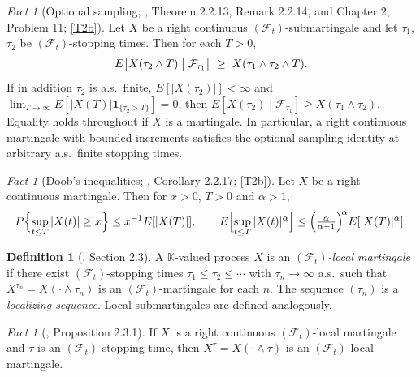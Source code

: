 \documentclass[11pt,a4paper]{article}
\theoremstyle{plain}
\theoremstyle{definition}
\newtheorem{definition}[theorem]{Definition}
\theoremstyle{remark}
\newtheorem{fact}[theorem]{Fact}
\newcommand{\Filt}{\mathcal{F}}
\newcommand{\K}{\mathbb{K}}
\newcommand{\one}{\mathbf{1}}
\newcommand{\EK}{\cite{EK86}}
\begin{document}
\begin{fact}[Optional sampling; \EK, Theorem 2.2.13, Remark 2.2.14, and Chapter 2, Problem 11; \eqref{T2b}]
  \label{fact:optsampl}
  Let $X$ be a right continuous $(\Filt_t)$-submartingale and let $\tau_1$,
  $\tau_2$ be $(\Filt_t)$-stopping times.  Then for each $T > 0$,
  \begin{equation}
    \label{eq:optsampl}
    E\bigl[ X(\tau_2 \wedge T) \bigm| \Filt_{\tau_1} \bigr]
      \;\geq\; X(\tau_1 \wedge \tau_2 \wedge T) .
  \end{equation}
  If in addition $\tau_2$ is a.s.\ finite, $E[|X(\tau_2)|] < \infty$ and
  $\lim_{T \to \infty} E[|X(T)| \one_{\{\tau_2 > T\}}] = 0$, then
  $E[X(\tau_2) \mid \Filt_{\tau_1}] \geq X(\tau_1 \wedge \tau_2)$.  Equality holds
  throughout if $X$ is a martingale.  In particular, a right continuous
  martingale with bounded increments satisfies the optional sampling identity at
  arbitrary a.s.\ finite stopping times.
\end{fact}

\begin{fact}[Doob's inequalities; \EK, Corollary 2.2.17; \eqref{T2b}]
  \label{fact:doob}
  Let $X$ be a right continuous martingale.  Then for $x > 0$, $T > 0$ and
  $\alpha > 1$,
  \begin{equation}
    \label{eq:doob}
    P\Bigl\{ \sup_{t \leq T} |X(t)| \geq x \Bigr\} \leq x^{-1} E[|X(T)|],
    \qquad
    E\Bigl[ \sup_{t \leq T} |X(t)|^\alpha \Bigr]
      \leq \Bigl( \tfrac{\alpha}{\alpha-1} \Bigr)^{\!\alpha} E[|X(T)|^\alpha] .
  \end{equation}
\end{fact}

\begin{definition}[\EK, Section 2.3]
  \label{def:localmartingale}
  A $\K$-valued process $X$ is an \emph{$(\Filt_t)$-local martingale} if there
  exist $(\Filt_t)$-stopping times $\tau_1 \leq \tau_2 \leq \cdots$ with
  $\tau_n \to \infty$ a.s.\ such that $X^{\tau_n} = X(\cdot \wedge \tau_n)$ is an
  $(\Filt_t)$-martingale for each $n$.  The sequence $(\tau_n)$ is a
  \emph{localizing sequence}.  Local submartingales are defined analogously.
\end{definition}

\begin{fact}[\EK, Proposition 2.3.1]
  \label{fact:stoppedlocalmg}
  If $X$ is a right continuous $(\Filt_t)$-local martingale and $\tau$ is an
  $(\Filt_t)$-stopping time, then $X^\tau = X(\cdot \wedge \tau)$ is an
  $(\Filt_t)$-local martingale.
\end{fact}
\end{document}
